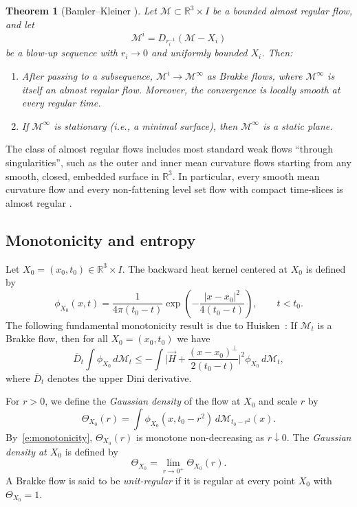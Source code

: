 \documentclass[11pt,reqno]{amsart}
\numberwithin{equation}{section}
\newtheorem{theorem}[equation]{Theorem}
\theoremstyle{definition}
\theoremstyle{remark}
\theoremstyle{remark}
\theoremstyle{remark}
\theoremstyle{remark}\newtheorem{conjecture}[equation]{Conjecture}
\theoremstyle{remark}\newtheorem{question}[equation]{Question}
\begin{document}
\begin{theorem}[Bamler–Kleiner \cite{BK23}] \label{t:BK}
Let $\mathcal{M} \subset \mathbb{R}^3 \times I$ be a bounded almost regular flow, and let
\[
\mathcal{M}^i = D_{r_i^{-1}}(\mathcal{M} - X_i)
\]
be a blow-up sequence with $r_i \to 0$ and uniformly bounded $X_i$. Then:
\begin{enumerate}
    \item After passing to a subsequence, $\mathcal{M}^i \to \mathcal{M}^\infty$ as Brakke flows, where $\mathcal{M}^\infty$ is itself an almost regular flow. Moreover, the convergence is locally smooth at every regular time.
    \item If $\mathcal{M}^\infty$ is stationary (i.e., a minimal surface), then $\mathcal{M}^\infty$ is a static plane.
\end{enumerate}
\end{theorem}

The class of almost regular flows includes most standard weak flows “through singularities”, such as the outer and inner mean curvature flows starting from any smooth, closed, embedded surface in $\mathbb{R}^3$. In particular, every smooth mean curvature flow and every non-fattening level set flow with compact time-slices is almost regular \cite{BK23}.








\subsection{Monotonicity and entropy}


Let $X_0 = (x_0, t_0) \in \mathbb{R}^3 \times I$.  
The backward heat kernel centered at $X_0$ is defined by
\[
    \phi_{X_0}(x,t) = \frac{1}{4\pi (t_0 - t)} 
    \exp\!\left(- \frac{|x - x_0|^2}{4 (t_0 - t)}\right),
    \qquad t < t_0.
\]
The following fundamental monotonicity result is due to Huisken~\cite{Hu90}: If $\mathcal{M}_t$ is a Brakke flow, then for all $X_0 = (x_0, t_0)$ we have
\begin{equation}\label{e:monotonicity}
    \overline{D}_t \int \phi_{X_0} \, d\mathcal{M}_t
    \le
    - \int 
    \Big| \vec{H} + \frac{(x - x_0)^{\perp}}{2(t_0 - t)} \Big|^2
    \phi_{X_0} \, d\mathcal{M}_t,
\end{equation}
where $\overline{D}_t$ denotes the upper Dini derivative.

For $r > 0$, we define the \emph{Gaussian density} of the flow at $X_0$ and scale $r$ by
\[
    \Theta_{X_0}(r)
    = \int \phi_{X_0}(x, t_0 - r^2)\, d\mathcal{M}_{t_0 - r^2}(x).
\]
By~\eqref{e:monotonicity}, $\Theta_{X_0}(r)$ is monotone non-decreasing as $r \downarrow 0$.  
The \emph{Gaussian density at $X_0$} is defined by
\[
    \Theta_{X_0} = \lim_{r \to 0^+} \Theta_{X_0}(r).
\]
A Brakke flow is said to be \emph{unit-regular} if it is regular at every point $X_0$ with $\Theta_{X_0} = 1$.
\end{document}
